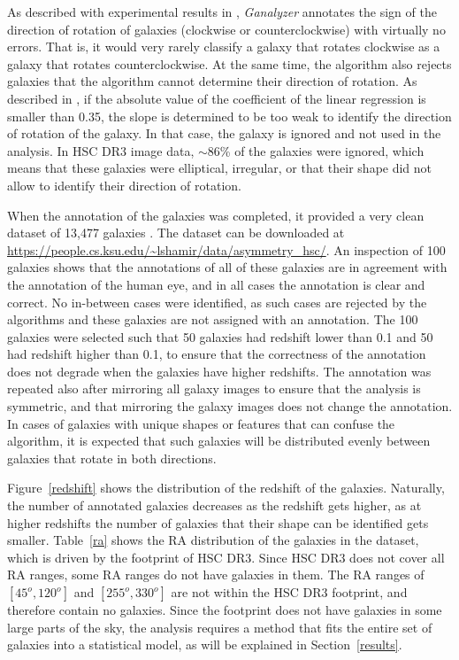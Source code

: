 \documentclass[final,5p,times,twocolumn]{article}
\begin{document}
As described with experimental results in \citep{shamir2021large,shamir2022large,shamir2022analysis,shamir2022analysis2,shamir2022asymmetry}, {\it Ganalyzer} annotates the sign of the direction of rotation of galaxies (clockwise or counterclockwise) with virtually no errors. That is, it would very rarely classify a galaxy that rotates clockwise as a galaxy that rotates counterclockwise. At the same time, the algorithm also rejects galaxies that the algorithm cannot determine their direction of rotation. As described in \citep{shamir2011ganalyzer}, if the absolute value of the coefficient of the linear regression is smaller than 0.35, the slope is determined to be too weak to identify the direction of rotation of the galaxy. In that case, the galaxy is ignored and not used in the analysis. In HSC DR3 image data, $\sim$86\% of the galaxies were ignored, which means that these galaxies were elliptical, irregular, or that their shape did not allow to identify their direction of rotation.

When the annotation of the galaxies was completed, it provided a very clean dataset of 13,477 galaxies \citep{shamir2024empirical}. The dataset can be downloaded at \url{https://people.cs.ksu.edu/~lshamir/data/asymmetry_hsc/}. An inspection of 100 galaxies shows that the annotations of all of these galaxies are in agreement with the annotation of the human eye, and in all cases the annotation is clear and correct. No in-between cases were identified, as such cases are rejected by the algorithms and these galaxies are not assigned with an annotation. The 100 galaxies were selected such that 50 galaxies had redshift lower than 0.1 and 50 had redshift higher than 0.1, to ensure that the correctness of the annotation does not degrade when the galaxies have higher redshifts. The annotation was repeated also after mirroring all galaxy images to ensure that the analysis is symmetric, and that mirroring the galaxy images does not change the annotation. In cases of galaxies with unique shapes or features that can confuse the algorithm, it is expected that such galaxies will be distributed evenly between galaxies that rotate in both directions.

Figure~\ref{redshift} shows the distribution of the redshift of the galaxies. Naturally, the number of annotated galaxies decreases as the redshift gets higher, as at higher redshifts the number of galaxies that their shape can be identified gets smaller. Table~\ref{ra} shows the RA distribution of the galaxies in the dataset, which is driven by the footprint of HSC DR3. Since HSC DR3 does not cover all RA ranges, some RA ranges do not have galaxies in them. The RA ranges of $[45^o,120^o]$ and $[255^o,330^o]$ are not within the HSC DR3 footprint, and therefore contain no galaxies. Since the footprint does not have galaxies in some large parts of the sky, the analysis requires a method that fits the entire set of galaxies into a statistical model, as will be explained in Section~\ref{results}.
\end{document}
